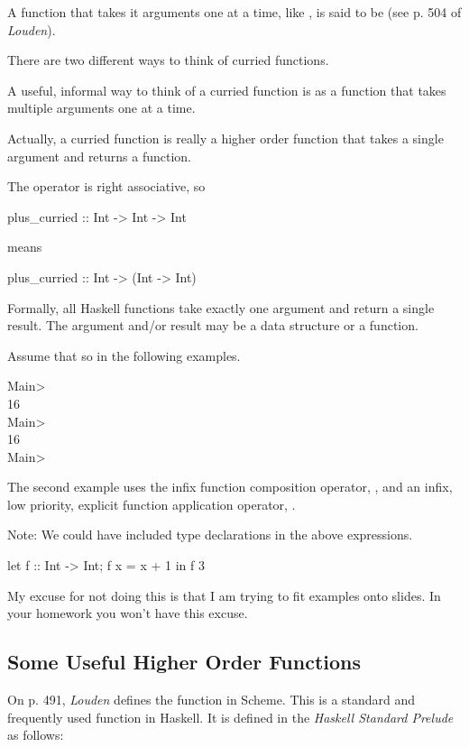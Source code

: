 \documentclass{seminar}
\begin{document}
\begin{slide}
A function that takes it arguments one at a time, like ,
is said to be  (see p. 504 of \textit{Louden}).

\newslide

There are two different ways to think of curried functions.

A useful, informal way to think of a curried function
is as a function that takes
multiple arguments one at a time.

Actually, a curried function is really a higher order function that
takes a single argument and returns a function.

The operator \textcd{->} is right associative, so
\begin{code}
plus\_curried :: Int -> Int -> Int
\end{code}
means
\begin{code}
plus\_curried :: Int -> (Int -> Int)
\end{code}

Formally, all Haskell functions take exactly one argument and return
a single result.  The argument and/or result may be a data structure
or a function.

\newslide

Assume that
\newline
so  in the following examples.
\begin{code}[SystemColor]
Main> \\
16\\
Main> \\
16\\
Main>
\end{code}

The second example uses the infix function composition operator, ,
and an infix, low priority, explicit function application operator,
\textcd{\$}.

Note:  We could have included type declarations in the above expressions.
\begin{code}
let f :: Int -> Int; f x = x + 1 in f 3
\end{code}

My excuse for not doing this is
that I am trying to fit examples onto slides.  In your
homework you won't have this excuse.

\newslide

\subsection*{Some Useful Higher Order Functions}
On p. 491, \textit{Louden} defines the function  in Scheme.
This is a standard and frequently used function in Haskell.  It is defined
in the \textit{Haskell Standard Prelude} as follows:


\end{slide}
\end{document}
